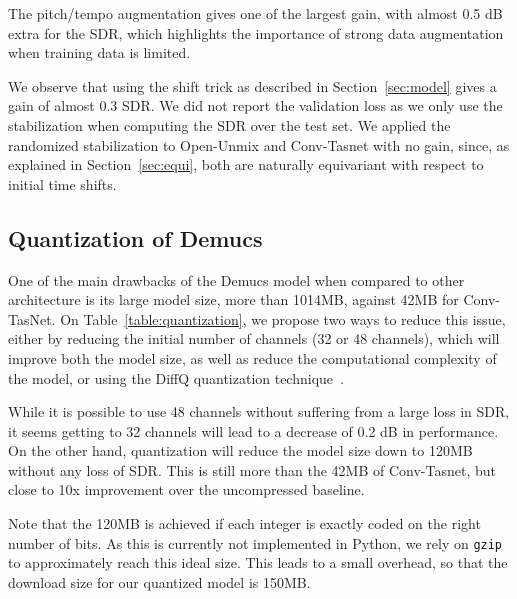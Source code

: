 The pitch/tempo augmentation gives one of the largest gain, with almost 0.5 dB extra for the SDR, which highlights the importance of strong data augmentation when training data is limited.


We observe that using the shift trick as described in Section~\ref{sec:model} gives a gain of almost 0.3 SDR.
We did not report the validation loss as we only use the stabilization when computing the SDR over the test set.
We applied the randomized stabilization to Open-Unmix and Conv-Tasnet with no gain, since, as explained in Section~\ref{sec:equi}, both are naturally equivariant with respect to initial time shifts.







\subsection{Quantization of Demucs}

One of the main drawbacks of the Demucs model when compared to other architecture is its large model size, more than 1014MB, against 42MB for Conv-TasNet. On Table~\ref{table:quantization}, we propose 
two ways to reduce this issue, either by reducing the initial number of channels (32 or 48 channels), which will improve both the model size, as well as reduce the computational complexity of the model, or using the DiffQ quantization technique~\citep{defossez2021differentiable}.

While it is possible to use 48 channels without suffering from a large loss in SDR, it seems getting to 32 channels will lead to a decrease of 0.2 dB in performance.
On the other hand, quantization will reduce the model size down to 120MB without any loss of SDR. This is still more than the 42MB of Conv-Tasnet, but close to 10x improvement over the uncompressed baseline.

Note that the 120MB is achieved if each integer is exactly
coded on the right number of bits. As this is currently
not implemented in Python, we rely on \texttt{gzip} to
approximately reach this ideal size. This leads to a small overhead, so that the download size for our quantized model is
150MB.
